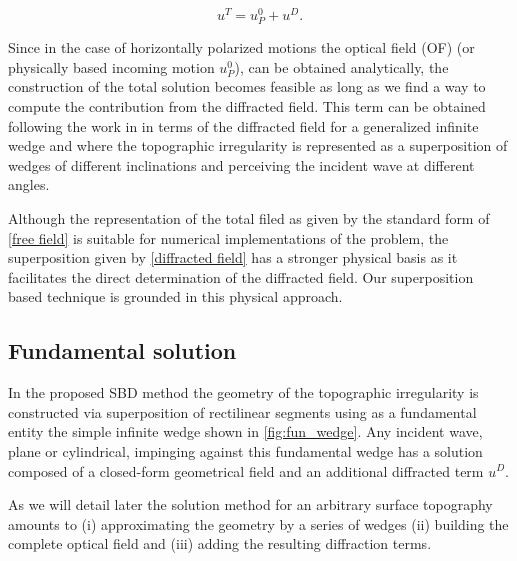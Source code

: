 \documentclass[11pt,letterpaper]{article}
\begin{document}
\begin{equation}
\label{diffracted field}
{u^T}={u^0_P}+{u^D}.
\end{equation}

Since in the case of horizontally polarized motions the optical field (OF) (or physically based incoming motion $u^0_P$), can be obtained analytically, the construction of the total solution becomes feasible as long as we find a way to compute the contribution from the diffracted field. This term can be obtained following the work in \cite{jaramillo2013analytic} in terms of the diffracted field for a generalized infinite wedge and where the topographic irregularity is represented as a superposition of wedges of different inclinations and perceiving the incident wave at different angles.

Although the representation of the total filed as given by the standard form of \cref{free field} is suitable for numerical implementations of the problem, the superposition given by \cref{diffracted field} has a stronger physical basis as it facilitates the direct determination of the diffracted field. Our superposition based technique is grounded in this physical approach.

\subsection*{Fundamental solution}

In the proposed SBD method the geometry of the topographic irregularity is constructed via superposition of rectilinear segments using as a fundamental entity the simple infinite wedge shown in \cref{fig:fun_wedge}. Any incident wave, plane or cylindrical, impinging against this fundamental wedge has a solution composed of a closed-form geometrical field  and an additional diffracted term $u^D$.

As we will detail later the solution method for an arbitrary surface topography amounts to (i) approximating the geometry by a series of wedges (ii) building the complete optical field and (iii) adding the resulting diffraction terms.
\end{document}
